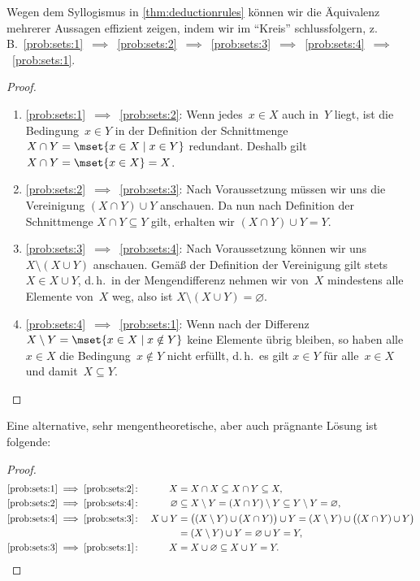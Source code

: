 \documentclass[a4paper]{article}
\begin{document}
\begin{solution}
    Wegen dem Syllogismus in \cref{thm:deductionrules} können wir die Äquivalenz mehrerer Aussagen effizient zeigen, indem wir im "`Kreis"' schlussfolgern, z.\,B.\ \ref{prob:sets:1}~$\implies$~\ref{prob:sets:2}~$\implies$~\ref{prob:sets:3}~$\implies$~\ref{prob:sets:4}~$\implies$~\ref{prob:sets:1}.
    \begin{proof}\leavevmode
        \begin{enumerate}
            \item \ref{prob:sets:1}~$\implies$~\ref{prob:sets:2}: Wenn jedes~$x \in X$ auch in~$Y$ liegt, ist die Bedingung~$x \in Y$ in der Definition der Schnittmenge $X \cap Y = \mset{x \in X \mid x \in Y}$ redundant. Deshalb gilt $X \cap Y = \mset{x \in X} = X$.
            \item \ref{prob:sets:2}~$\implies$~\ref{prob:sets:3}: Nach Voraussetzung müssen wir uns die Vereinigung $(X \cap Y) \cup Y$ anschauen. Da nun nach Definition der Schnittmenge $X \cap Y \subseteq Y$ gilt, erhalten wir $(X \cap Y) \cup Y = Y$.
            \item \ref{prob:sets:3}~$\implies$~\ref{prob:sets:4}: Nach Voraussetzung können wir uns $X \setminus (X \cup Y)$ anschauen. Gemäß der Definition der Vereinigung gilt stets $X \in X \cup Y$, d.\,h.\ in der Mengendifferenz nehmen wir von~$X$ mindestens alle Elemente von~$X$ weg, also ist $X \setminus (X \cup Y) = \varnothing$.
            \item \ref{prob:sets:4}~$\implies$~\ref{prob:sets:1}: Wenn nach der Differenz $X \setminus Y = \mset{x \in X \mid x \notin Y}$ keine Elemente übrig bleiben, so haben alle~$x \in X$ die Bedingung~$x \notin Y$ nicht erfüllt, d.\,h.\ es gilt $x \in Y$ für alle~$x \in X$ und damit~$X \subseteq Y$.\qedhere
        \end{enumerate}
    \end{proof}

    Eine alternative, sehr mengentheoretische, aber auch prägnante Lösung ist folgende:
    \begin{proof}
        \begin{align*}
            \text{\ref{prob:sets:1}} & \implies \text{\ref{prob:sets:2}}\colon &  X &= X \cap X \subseteq X \cap Y \subseteq X,                                                        \\
            \text{\ref{prob:sets:2}} & \implies \text{\ref{prob:sets:4}}\colon &  \varnothing &\subseteq X \setminus Y = (X \cap Y) \setminus Y \subseteq Y \setminus Y = \varnothing, \\
            \text{\ref{prob:sets:4}} & \implies \text{\ref{prob:sets:3}}\colon &  X \cup Y &= \bigl((X \setminus Y) \cup (X \cap Y)\bigr) \cup Y = (X \setminus Y) \cup \bigl((X \cap Y) \cup Y\bigr) \\
            &&&= (X \setminus Y) \cup Y = \varnothing \cup Y = Y,                                         \\
            \text{\ref{prob:sets:3}} & \implies \text{\ref{prob:sets:1}}\colon &  X &= X \cup \varnothing \subseteq X \cup Y = Y. \qedhere
        \end{align*}
    \end{proof}
\end{solution}
\end{document}
